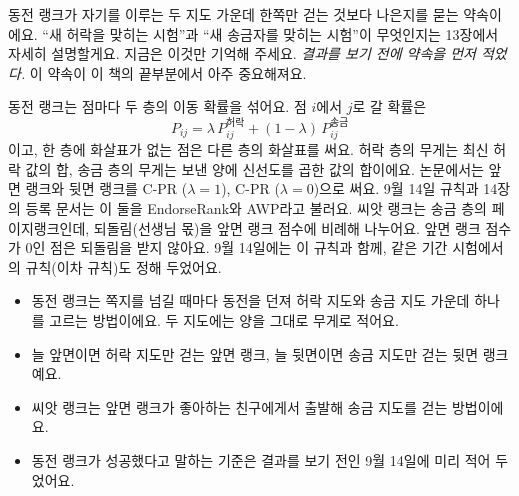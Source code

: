 동전 랭크가 자기를 이루는 두 지도 가운데 한쪽만 걷는 것보다 나은지를 묻는 약속이에요.
“새 허락을 맞히는 시험”과 “새 송금자를 맞히는 시험”이 무엇인지는 13장에서 자세히 설명할게요.
지금은 이것만 기억해 주세요.
\emph{결과를 보기 전에 약속을 먼저 적었다.}
이 약속이 이 책의 끝부분에서 아주 중요해져요.

\begin{deeper}[진짜 정의]
동전 랭크는 점마다 두 층의 이동 확률을 섞어요. 점 $i$에서 $j$로 갈 확률은
\[
P_{ij} = \lambda\, P^{\text{허락}}_{ij} + (1-\lambda)\, P^{\text{송금}}_{ij}
\]
이고, 한 층에 화살표가 없는 점은 다른 층의 화살표를 써요.
허락 층의 무게는 최신 허락 값의 합, 송금 층의 무게는 보낸 양에 신선도를 곱한 값의 합이에요.
논문에서는 앞면 랭크와 뒷면 랭크를 C-PR ($\lambda=1$), C-PR ($\lambda=0$)으로 써요.
9월 14일 규칙과 14장의 등록 문서는 이 둘을 EndorseRank와 AWP라고 불러요.
씨앗 랭크는 송금 층의 페이지랭크인데, 되돌림(선생님 몫)을 앞면 랭크 점수에 비례해 나누어요.
앞면 랭크 점수가 0인 점은 되돌림을 받지 않아요.
9월 14일에는 이 규칙과 함께, 같은 기간 시험에서의 규칙(이차 규칙)도 정해 두었어요.
\end{deeper}

\begin{learned}
\begin{itemize}
\item 동전 랭크는 쪽지를 넘길 때마다 동전을 던져 허락 지도와 송금 지도 가운데 하나를 고르는 방법이에요. 두 지도에는 양을 그대로 무게로 적어요.
\item 늘 앞면이면 허락 지도만 걷는 앞면 랭크, 늘 뒷면이면 송금 지도만 걷는 뒷면 랭크예요.
\item 씨앗 랭크는 앞면 랭크가 좋아하는 친구에게서 출발해 송금 지도를 걷는 방법이에요.
\item 동전 랭크가 성공했다고 말하는 기준은 결과를 보기 전인 9월 14일에 미리 적어 두었어요.
\end{itemize}
\end{learned}
